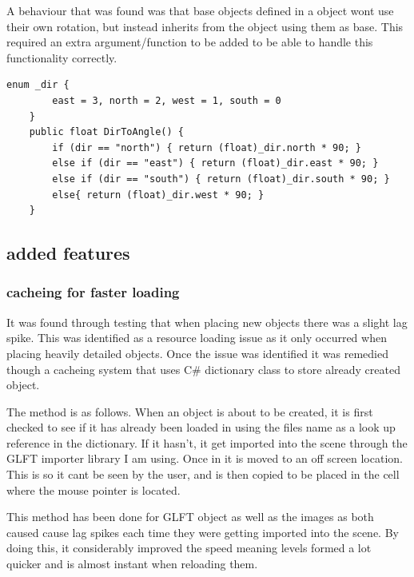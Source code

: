A behaviour that was found was that base objects defined in a object wont use their own rotation, but instead inherits from the object using them as base. This required an extra argument/function to be added to be able to handle this functionality correctly. 

\begin{minipage}{\textwidth}
\begin{lstlisting}[language={[Sharp]C}, caption=direction definition and conversion label=clst:correctPlacment]
    enum _dir {
        east = 3, north = 2, west = 1, south = 0
    }
    public float DirToAngle() {
        if (dir == "north") { return (float)_dir.north * 90; }
        else if (dir == "east") { return (float)_dir.east * 90; }
        else if (dir == "south") { return (float)_dir.south * 90; }
        else{ return (float)_dir.west * 90; }
    }
\end{lstlisting}
\end{minipage}

\subsection{added features}
\subsubsection{cacheing for faster loading}
It was found through testing that when placing new objects there was a slight lag spike. This was identified as a resource loading issue as it only occurred when placing heavily detailed objects. Once the issue was identified it was remedied though a cacheing system that uses C\# dictionary class to store already created object.

The method is as follows. When an object is about to be created, it is first checked to see if it has already been loaded in using the files name as a look up reference in the dictionary. If it hasn't, it get imported into the scene through the GLFT importer library I am using. Once in it is moved to an off screen location. This is so it cant be seen by the user, and is then copied to be placed in the cell where the mouse pointer is located.

This method has been done for GLFT object as well as the images as both caused cause lag spikes each time they were getting imported into the scene. By doing this, it considerably improved the speed meaning levels formed a lot quicker and is almost instant when reloading them. 


